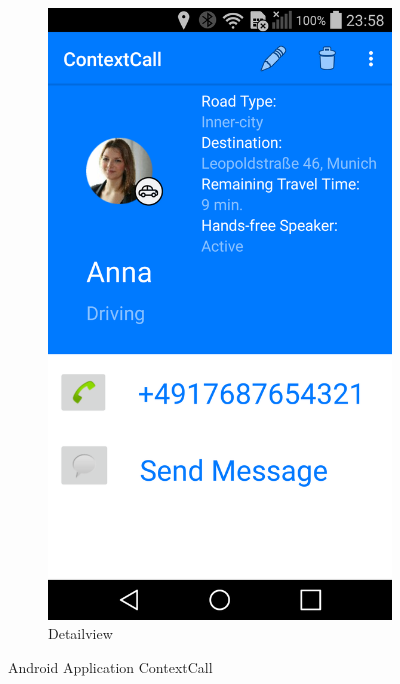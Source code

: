 \documentclass{sigchi}
\begin{document}
\begin{figure}[H]
\begin{subfigure}{.23\textwidth}
  \includegraphics[width=.7\linewidth]{figures/app_2}
  \caption{Detailview}
  \label{fig:app_2}
\end{subfigure}
\caption{Android Application ContextCall}
\label{fig:app}
\end{figure}
\end{document}
